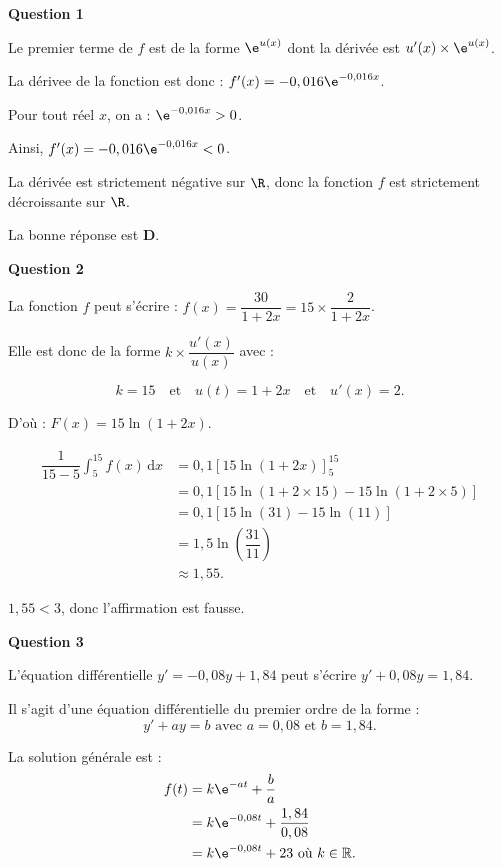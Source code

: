 \bigskip

\textbf{Question 1}

\medskip

Le premier terme de $f$ est de la forme $\e^{u(x)}$ dont la dérivée est $u'(x)\times\e^{u(x)}$.

La dérivee de la fonction est donc : $f'(x)=-0,016\e^{-0,016x}$.

Pour tout réel $x$, on a : $\e^{-0,016x}>0$.

Ainsi, $f'(x)=-0,016\e^{-0,016x}<0$.

La dérivée est strictement négative sur $\R$, donc la fonction $f$ est strictement décroissante sur $\R$.

La bonne réponse est \textbf{D}.

\bigskip

\textbf{Question 2}

\medskip

La fonction $f$ peut s'écrire : 
$f(x) = \dfrac{30}{1 + 2x} = 15\times\dfrac{2}{1 + 2x}$.

Elle est donc de la forme $k\times\dfrac{u'(x)}{u(x)}$ avec :

\[k = 15 \quad \text{et} \quad u(t) = 1 + 2x \quad \text{et} \quad u'(x) = 2.\]

D'où : $F(x) = 15\ln(1 + 2x)$.

\begin{align*}
\displaystyle\dfrac{1}{15 - 5}\int_5^{15} f(x)\,\text{d}x &= 0,1[15\ln(1 + 2x)]_5^{15} \\
&= 0,1[15\ln(1 + 2\times15) - 15\ln(1 + 2\times5)] \\
&= 0,1[15\ln(31)-15\ln(11)] \\
&= 1,5\ln\left(\dfrac{31}{11}\right) \\
&\approx 1,55.
\end{align*}

$1,55<3$, donc l'affirmation est fausse.

\bigskip

\textbf{Question 3}

\medskip

L'équation différentielle $y' = - 0,08y + 1,84$ peut s'écrire $y' + 0,08y = 1,84$.
    
Il s'agit d'une équation différentielle du premier ordre de la forme :
\[y' + ay = b \text{ avec } a = 0,08 \text{ et } b = 1,84.\]

La solution générale est :
\begin{align*}
f(t) &= k\e^{-at} + \dfrac{b}{a} \\
&= k\e^{-0,08t} + \dfrac{1,84}{0,08} \\
&= k\e^{-0,08t} + 23 \text{ où } k \in \mathbb{R}.
\end{align*}

